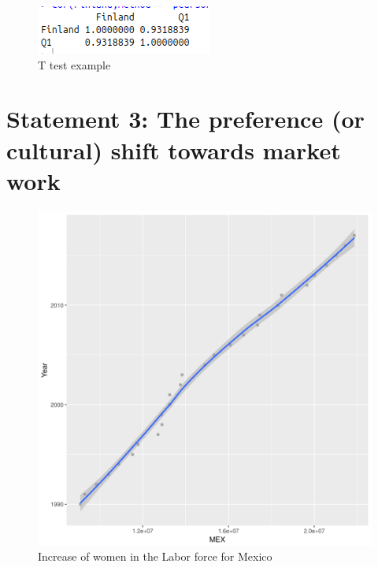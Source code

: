 \documentclass[12pt]{article}
\begin{document}
\begin{figure}[h!]
\caption{T test example}
\centering
\includegraphics[scale=.5]{questFinlandCor.png}
\end{figure}

\clearpage


\section{Statement 3: The preference (or cultural) shift towards market work }

\begin{figure}[h!]
\caption{Increase of women in the Labor force for Mexico  }
\centering
\includegraphics[scale=.5]{quest3Mexico2.png}
\end{figure}
\end{document}
